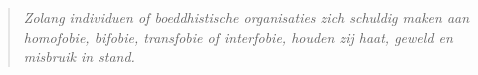 \documentclass[12pt,openany]{book}
\begin{document}
\newpage
\thispagestyle{empty}

\rmfamily

\begin{center}\end{center}
\begin{center}

\vfill


\vfill

\end{center}

\begin{figure}[h]
    \centering
\end{figure}

\thispagestyle{empty}

\begin{figure}[h]
\end{figure}

\thispagestyle{empty}

\mainmatter
\newpage
\thispagestyle{empty}
\begin{quote}
\centering
\textit{\Large Zolang individuen of boeddhistische organisaties zich schuldig maken aan homofobie, bifobie, transfobie of interfobie, houden zij haat, geweld en misbruik in stand.}
\end{quote}
\end{document}
